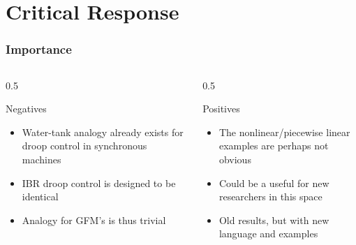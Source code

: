 \documentclass[
    aspectratio=169,
    \ifdefined\HANDOUT
    handout
    \else
    \fi
]{beamer}
\begin{document}
\section{Critical Response}
\begin{frame}
    \frametitle{Importance}
    \begin{columns}
        \begin{column}{0.5\textwidth}
            \begin{block}{Negatives}
                \begin{itemize}
                    \item Water-tank analogy already exists for droop control in synchronous machines
                    \item IBR droop control is designed to be identical
                    \item Analogy for GFM's is thus trivial
                \end{itemize}
            \end{block}
        \end{column}
        \begin{column}{0.5\textwidth}
            \begin{block}{Positives}
                \begin{itemize}
                    \item The nonlinear/piecewise linear examples are perhaps not obvious
                    \item Could be a useful for new researchers in this space
                    \item Old results, but with new language and examples
                \end{itemize}
            \end{block}
        \end{column}
    \end{columns}
\end{frame}
\end{document}
